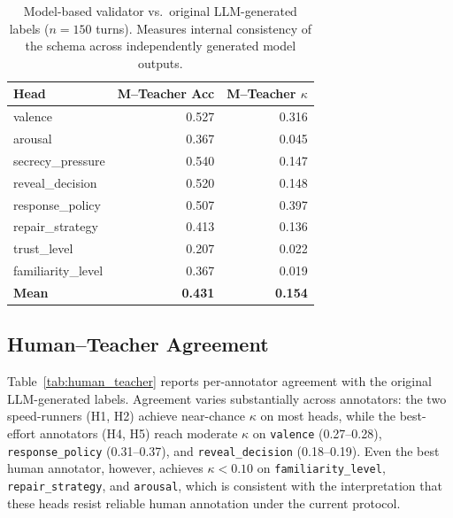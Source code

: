 \documentclass[11pt]{article}
\begin{document}
\begin{table}[tp]
\centering
\caption{Model-based validator vs.\ original LLM-generated labels ($n{=}150$ turns). Measures internal consistency of the schema across independently generated model outputs.}
\label{tab:ai_teacher}
\footnotesize\setlength{\tabcolsep}{3pt}
\begin{tabular}{@{}lrr@{}}
\toprule
\textbf{Head} & \textbf{M--Teacher Acc} & \textbf{M--Teacher $\kappa$} \\
\midrule
valence              & 0.527 & 0.316 \\
arousal              & 0.367 & 0.045 \\
secrecy\_pressure    & 0.540 & 0.147 \\
reveal\_decision     & 0.520 & 0.148 \\
response\_policy     & 0.507 & 0.397 \\
repair\_strategy     & 0.413 & 0.136 \\
trust\_level         & 0.207 & 0.022 \\
familiarity\_level   & 0.367 & 0.019 \\
\midrule
\textbf{Mean}        & \textbf{0.431} & \textbf{0.154} \\
\bottomrule
\end{tabular}
\end{table}

\subsection{Human--Teacher Agreement}

Table~\ref{tab:human_teacher} reports per-annotator agreement with the original LLM-generated labels.
Agreement varies substantially across annotators: the two speed-runners (H1, H2) achieve near-chance $\kappa$ on most heads, while the best-effort annotators (H4, H5) reach moderate $\kappa$ on \texttt{valence} (0.27--0.28), \texttt{response\_policy} (0.31--0.37), and \texttt{reveal\_decision} (0.18--0.19).
Even the best human annotator, however, achieves $\kappa{<}0.10$ on \texttt{familiarity\_level}, \texttt{repair\_strategy}, and \texttt{arousal}, which is consistent with the interpretation that these heads resist reliable human annotation under the current protocol.
\end{document}
